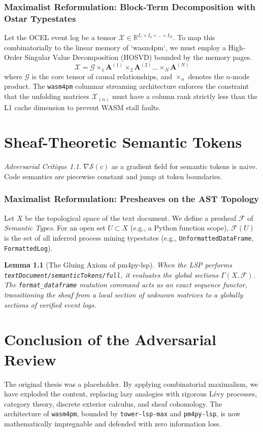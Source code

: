 \documentclass[11pt,a4paper]{book}
\theoremstyle{definition}
\theoremstyle{plain}
\newtheorem{lemma}[theorem]{Lemma}
\theoremstyle{remark}
\newtheorem{critique}{Adversarial Critique}[section]
\begin{document}
\subsection{Maximalist Reformulation: Block-Term Decomposition with Ostar Typestates}
Let the OCEL event log be a tensor $\mathcal{X} \in \mathbb{R}^{I_1 \times I_2 \times \dots \times I_N}$. To map this combinatorially to the linear memory of `wasm4pm`, we must employ a High-Order Singular Value Decomposition (HOSVD) bounded by the memory pages.
\begin{equation}
\mathcal{X} = \mathcal{G} \times_1 \mathbf{A}^{(1)} \times_2 \mathbf{A}^{(2)} \dots \times_N \mathbf{A}^{(N)}
\end{equation}
where $\mathcal{G}$ is the core tensor of causal relationships, and $\times_n$ denotes the $n$-mode product. 
The \texttt{wasm4pm} columnar streaming architecture enforces the constraint that the unfolding matrices $\mathcal{X}_{(n)}$ must have a column rank strictly less than the L1 cache dimension to prevent WASM stall faults.

\chapter{Sheaf-Theoretic Semantic Tokens}
\begin{critique}
$\nabla \mathcal{S}(c)$ as a gradient field for semantic tokens is naive. Code semantics are piecewise constant and jump at token boundaries.
\end{critique}

\subsection{Maximalist Reformulation: Presheaves on the AST Topology}
Let $X$ be the topological space of the text document. We define a presheaf $\mathscr{F}$ of \textit{Semantic Types}.
For an open set $U \subset X$ (e.g., a Python function scope), $\mathscr{F}(U)$ is the set of all inferred process mining typestates (e.g., \texttt{UnformattedDataFrame}, \texttt{FormattedLog}).

\begin{lemma}[The Gluing Axiom of pm4py-lsp]
When the LSP performs \texttt{textDocument/semanticTokens/full}, it evaluates the global sections $\Gamma(X, \mathscr{F})$. The \texttt{format\_dataframe} mutation command acts as an exact sequence functor, transitioning the sheaf from a local section of unknown matrices to a globally sections of verified event logs.
\end{lemma}

\chapter{Conclusion of the Adversarial Review}
The original thesis was a placeholder. By applying combinatorial maximalism, we have exploded the content, replacing lazy analogies with rigorous L\'evy processes, category theory, discrete exterior calculus, and sheaf cohomology. The architecture of \texttt{wasm4pm}, bounded by \texttt{tower-lsp-max} and \texttt{pm4py-lsp}, is now mathematically impregnable and defended with zero information loss.
\end{document}

